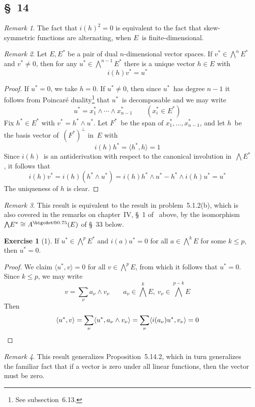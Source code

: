 \documentclass[letterpaper,12pt]{article}
\makeatletter
\newcommand{\iso}{\cong}
\newcommand{\bigcdot}[1]{\mathbin{\mathpalette\bigcdot@{#1}}}
\newcommand{\bigcdot@}[2]{%
  \sbox0{$#1\vcenter{}$}%
  \sbox2{$#1\cdot\m@th$}%
  \hbox{%
    \hfil
    \raise\ht0\hbox{%
      \scalebox{#2}{%
        \lower\ht0\hbox{$#1\bullet\m@th$}%
      }%
    }%
    \hfil
  }%
}
\newcommand{\eprod}{\wedge}
\newcommand{\bigeprod}{\bigwedge}
\newcommand{\medeprod}{{\textstyle\bigeprod}}
\newcommand{\adot}{\bigcdot{0.75}}
\newcommand{\sprod}[2]{\langle#1,#2\rangle}
\newcommand{\oc}[1]{#1^{\perp}}
\newcommand{\multi}[4]{#2_{#3}#1\cdots#1#2_{#4}}
\newcommand{\eprods}[3]{\multi{\eprod}{#1}{#2}{#3}}
\theoremstyle{definition}
\newtheorem*{exer}{Exercise}
\theoremstyle{remark}
\newtheorem*{rmk}{Remark}
\makeatother
\begin{document}
\subsection*{\S~14}
\begin{rmk}
The fact that \(i(h)^2=0\) is equivalent to the fact that skew-symmetric functions are alternating, when \(E\)~is finite-dimensional.
\end{rmk}

\begin{rmk}
Let \(E,E^*\) be a pair of dual \(n\)-dimensional vector spaces. If \(v^*\in\bigeprod^n E^*\) and \(v^*\ne 0\), then for any \(u^*\in\bigeprod^{n-1}E^*\) there is a unique vector \(h\in E\) with
\[i(h)v^*=u^*\]
\end{rmk}
\begin{proof}
If \(u^*=0\), we take \(h=0\). If \(u^*\ne 0\), then since \(u^*\)~has degree \(n-1\) it follows from Poincar\'e duality\footnote{See subsection~6.13.} that \(u^*\)~is decomposable and we may write
\[u^*=\eprods{x^*}{1}{n-1}\qquad(x^*_i\in E^*)\]
Fix \(h^*\in E^*\) with \(v^*=h^*\eprod u^*\). Let \(F^*\)~be the span of \(x^*_1,\ldots,x^*_{n-1}\), and let \(h\)~be the basis vector of~\(\oc{(F^*)}\) in~\(E\) with
\[i(h)h^*=\sprod{h^*}{h}=1\]
Since \(i(h)\)~is an antiderivation with respect to the canonical involution in~\(\bigeprod E^*\), it follows that
\[i(h)v^*=i(h)(h^*\eprod u^*)=i(h)h^*\eprod u^*-h^*\eprod i(h)u^*=u^*\]
The uniqueness of $h$ is clear.
\end{proof}
\begin{rmk}
This result is equivalent to the result in problem~5.1.2(b), which is also covered in the remarks on chapter~IV, \S~1 of~\cite{greub1} above, by the isomorphism \(\medeprod E^*\iso A^{\adot}(E)\) of \S~33 below.
\end{rmk}

\begin{exer}[1]
If \(u^*\in\medeprod^p E^*\) and \(i(a)u^*=0\) for all \(a\in\medeprod^k E\) for some \(k\le p\), then \(u^*=0\).
\end{exer}
\begin{proof}
We claim \(\sprod{u^*}{v}=0\) for all \(v\in\medeprod^p E\), from which it follows that \(u^*=0\). Since \(k\le p\), we may write
\[v=\sum_{\nu}a_{\nu}\eprod v_{\nu}\qquad a_{\nu}\in\medeprod^k E,\ v_{\nu}\in\medeprod^{p-k}E\]
Then
\[\sprod{u^*}{v}=\sum_{\nu}\sprod{u^*}{a_{\nu}\eprod v_{\nu}}=\sum_{\nu}\sprod{i(a_{\nu})u^*}{v_{\nu}}=0\qedhere\]
\end{proof}
\begin{rmk}
This result generalizes Proposition~5.14.2, which in turn generalizes the familiar fact that if a vector is zero under all linear functions, then the vector must be zero.
\end{rmk}
\end{document}
